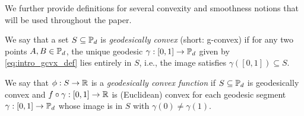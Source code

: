 \documentclass[sn-nature]{sn-jnl}%
\theoremstyle{thmstyleone}%
\theoremstyle{thmstyletwo}%
\theoremstyle{thmstylethree}%
\begin{document}
We further provide definitions for several convexity and smoothness notions that will be used throughout the paper.\\

\begin{definition}
We say that a set $S \subseteq \mathbb{P}_d$ is \textit{geodesically convex} (short: g-convex) if for any two points $A,B \in \mathbb{P}_d$, the unique geodesic $\gamma:[0,1] \to \mathbb{P}_d$ given by \eqref{eq:intro_gcvx_def} lies entirely in $S$, i.e., the image satisfies $\gamma([0,1]) \subseteq S$.    \\
\end{definition}

\begin{definition}
    We say that $\phi: S \to \mathbb{R}$ is a \textit{geodesically convex function} if $S \subseteq \mathbb{P}_d$ is geodesically convex and $f \circ \gamma :[0,1] \to \mathbb{R}$ is (Euclidean) convex for each geodesic segment $\gamma :[0,1] \to \mathbb{P}_d$ whose image is in $S$ with $\gamma(0) \neq \gamma(1)$.
\end{definition}
\end{document}
